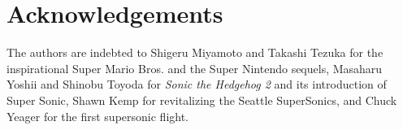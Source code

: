 \section*{Acknowledgements}

The authors are indebted to Shigeru Miyamoto and Takashi Tezuka for the inspirational Super Mario Bros.\cite{mario} and the Super Nintendo sequels, Masaharu Yoshii and Shinobu Toyoda for \textit{Sonic the Hedgehog 2}\cite{sonic2} and its introduction of Super Sonic, Shawn Kemp for revitalizing the Seattle SuperSonics, and Chuck Yeager for the first supersonic flight.

